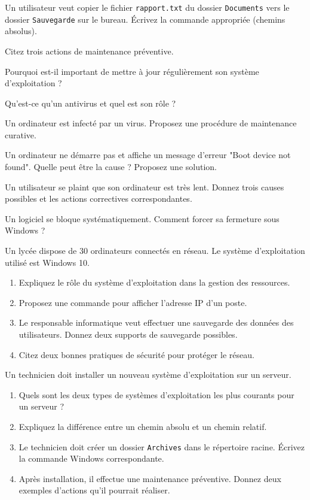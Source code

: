 \exo{}
Un utilisateur veut copier le fichier \texttt{rapport.txt} du dossier \texttt{Documents} vers le dossier \texttt{Sauvegarde} sur le bureau. Écrivez la commande appropriée (chemins absolus).


\exo{}
Citez trois actions de maintenance préventive.

\exo{}
Pourquoi est-il important de mettre à jour régulièrement son système d'exploitation ?

\exo{}
Qu'est-ce qu'un antivirus et quel est son rôle ?

\exo{}
Un ordinateur est infecté par un virus. Proposez une procédure de maintenance curative.


\exo{}
Un ordinateur ne démarre pas et affiche un message d'erreur "Boot device not found". Quelle peut être la cause ? Proposez une solution.

\exo{}
Un utilisateur se plaint que son ordinateur est très lent. Donnez trois causes possibles et les actions correctives correspondantes.

\exo{}
Un logiciel se bloque systématiquement. Comment forcer sa fermeture sous Windows ?


\exo{}
Un lycée dispose de 30 ordinateurs connectés en réseau. Le système d'exploitation utilisé est Windows 10.
\begin{enumerate}
    \item Expliquez le rôle du système d'exploitation dans la gestion des ressources.
    \item Proposez une commande pour afficher l'adresse IP d'un poste.
    \item Le responsable informatique veut effectuer une sauvegarde des données des utilisateurs. Donnez deux supports de sauvegarde possibles.
    \item Citez deux bonnes pratiques de sécurité pour protéger le réseau.
\end{enumerate}

\exo{}
Un technicien doit installer un nouveau système d'exploitation sur un serveur.
\begin{enumerate}
    \item Quels sont les deux types de systèmes d'exploitation les plus courants pour un serveur ?
    \item Expliquez la différence entre un chemin absolu et un chemin relatif.
    \item Le technicien doit créer un dossier \texttt{Archives} dans le répertoire racine. Écrivez la commande Windows correspondante.
    \item Après installation, il effectue une maintenance préventive. Donnez deux exemples d'actions qu'il pourrait réaliser.
\end{enumerate}

